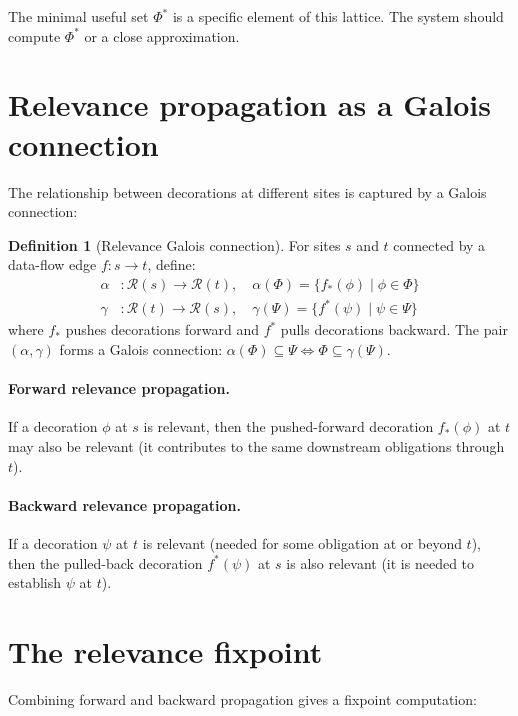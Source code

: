 \documentclass[11pt]{report}
\theoremstyle{definition}
\newtheorem{definition}{Definition}[section]
\theoremstyle{plain}
\begin{document}
The minimal useful set $\Phi^*$ is a specific element of this lattice. The
system should compute $\Phi^*$ or a close approximation.

\section{Relevance propagation as a Galois connection}

The relationship between decorations at different sites is captured by a
Galois connection:

\begin{definition}[Relevance Galois connection]
For sites $s$ and $t$ connected by a data-flow edge $f : s \to t$, define:
\begin{align*}
  \alpha &: \mathcal{R}(s) \to \mathcal{R}(t), \quad
    \alpha(\Phi) = \{f_*(\phi) \mid \phi \in \Phi\} \\
  \gamma &: \mathcal{R}(t) \to \mathcal{R}(s), \quad
    \gamma(\Psi) = \{f^*(\psi) \mid \psi \in \Psi\}
\end{align*}
where $f_*$ pushes decorations forward and $f^*$ pulls decorations backward.
The pair $(\alpha, \gamma)$ forms a Galois connection:
$\alpha(\Phi) \subseteq \Psi \iff \Phi \subseteq \gamma(\Psi)$.
\end{definition}

\paragraph{Forward relevance propagation.}
If a decoration $\phi$ at $s$ is relevant, then the pushed-forward decoration
$f_*(\phi)$ at $t$ may also be relevant (it contributes to the same
downstream obligations through $t$).

\paragraph{Backward relevance propagation.}
If a decoration $\psi$ at $t$ is relevant (needed for some obligation at or
beyond $t$), then the pulled-back decoration $f^*(\psi)$ at $s$ is also
relevant (it is needed to establish $\psi$ at $t$).

\section{The relevance fixpoint}

Combining forward and backward propagation gives a fixpoint computation:
\end{document}
